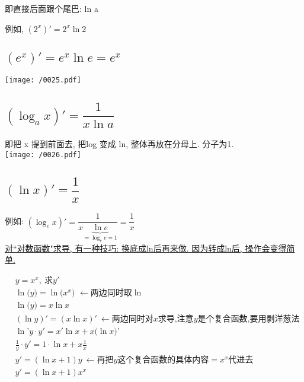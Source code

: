 \documentclass[UTF8]{ctexart}
\newenvironment{myEnvSample}
{ 
	\begin{tcolorbox}[title = {例},boxrule={0.1em},colframe={black!10}, colback={black!3},colbacktitle={black!10},coltitle={black}]
		}
		{		
	\end{tcolorbox}
}
\begin{document}
即直接后面跟个尾巴: ln a

例如, $(2^x)' = 2^x \ln 2$




\subsection{$(e^x)' = e^x \ln e = e^x$}

\texttt{[image: /0025.pdf]}




\subsection{$(\log_a x)' = \dfrac{1} {x \ln a}$}

即把 x 提到前面去, 把log 变成 ln, 整体再放在分母上. 分子为1. \\

\texttt{[image: /0026.pdf]}



\subsection{$(\ln x)' = \dfrac{1} {x}$}

例如: 
$\left( \log _ex \right) '=\dfrac{1}{x\underset{=\log _ee=1}{\underbrace{\ln e}}}=\dfrac{1}{x}$ \\


\underline{对``对数函数"求导, 有一种技巧: 换底成ln后再来做. 因为转成ln后, 操作会变得简单.} \\

\begin{myEnvSample}
	\begin{align*}
	&y=x^x,\ \text{求}y'\\
&\ln\text{(}y\text{)}=\ln\text{(}x^x\text{)\ }\gets \text{两边同时取}\ln\\
&\ln\text{(}y\text{)}=x\ln x\\
&\left( \ln y \right) '=\left( x\ln x \right) '\ \gets \text{两边同时对}x\text{求导,注意}y\text{是个复合函数,要用剥洋葱法}\\
&\ln\text{'}y\cdot y'=x'\ln x+x\text{(}\ln x\text{)'}\\
&\frac{1}{y}\cdot y'=1\cdot \ln x+x\frac{1}{x}\\
&y'=\left( \ln x+1 \right) y\ \gets \text{再把}y\text{这个复合函数的具体内容}=x^x\text{代进去}\\
&y'=\left( \ln x+1 \right) x^x
	\end{align*}
\end{myEnvSample}
\end{document}
